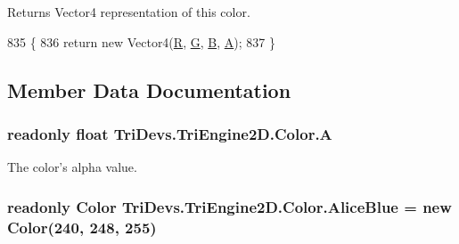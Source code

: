 \begin{DoxyReturn}{Returns}
Vector4 representation of this color.
\end{DoxyReturn}

\begin{DoxyCode}
835         \{
836             \textcolor{keywordflow}{return} \textcolor{keyword}{new} Vector4(\hyperlink{struct_tri_devs_1_1_tri_engine2_d_1_1_color_a1e20afa7351aa10c5ab4bfafcaeca021}{R}, \hyperlink{struct_tri_devs_1_1_tri_engine2_d_1_1_color_af8dd846268b6f84ba3f0ac0c8d26aa61}{G}, \hyperlink{struct_tri_devs_1_1_tri_engine2_d_1_1_color_afa0a5303b8b93c319df33909f9361e6f}{B}, \hyperlink{struct_tri_devs_1_1_tri_engine2_d_1_1_color_a007b76380dbfbb6ac2be76b45e3933e8}{A});
837         \}
\end{DoxyCode}


\subsection{Member Data Documentation}
\hypertarget{struct_tri_devs_1_1_tri_engine2_d_1_1_color_a007b76380dbfbb6ac2be76b45e3933e8}{
\subsubsection[{A}]{\setlength{\rightskip}{0pt plus 5cm}readonly float Tri\-Devs.\-Tri\-Engine2\-D.\-Color.\-A}}\label{struct_tri_devs_1_1_tri_engine2_d_1_1_color_a007b76380dbfbb6ac2be76b45e3933e8}


The color's alpha value. 

\hypertarget{struct_tri_devs_1_1_tri_engine2_d_1_1_color_a9b4d45690414a616d32de81bcc58d40e}{
\subsubsection[{Alice\-Blue}]{\setlength{\rightskip}{0pt plus 5cm}readonly {\bf Color} Tri\-Devs.\-Tri\-Engine2\-D.\-Color.\-Alice\-Blue = new {\bf Color}(240, 248, 255)\hspace{0.3cm}{\ttfamily [static]}}}\label{struct_tri_devs_1_1_tri_engine2_d_1_1_color_a9b4d45690414a616d32de81bcc58d40e}


